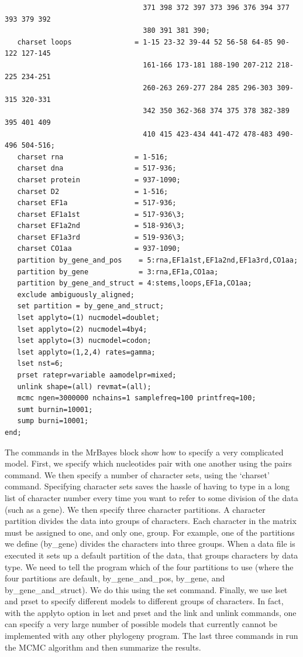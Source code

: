 \documentclass{svmult}
\begin{document}
\begin{verbatim}
                                 371 398 372 397 373 396 376 394 377 393 379 392 
                                 380 391 381 390;
   charset loops               = 1-15 23-32 39-44 52 56-58 64-85 90-122 127-145 
                                 161-166 173-181 188-190 207-212 218-225 234-251 
                                 260-263 269-277 284 285 296-303 309-315 320-331 
                                 342 350 362-368 374 375 378 382-389 395 401 409 
                                 410 415 423-434 441-472 478-483 490-496 504-516;
   charset rna                 = 1-516;
   charset dna                 = 517-936;
   charset protein             = 937-1090;
   charset D2                  = 1-516;
   charset EF1a                = 517-936;
   charset EF1a1st             = 517-936\3;
   charset EF1a2nd             = 518-936\3;
   charset EF1a3rd             = 519-936\3;
   charset CO1aa               = 937-1090;
   partition by_gene_and_pos    = 5:rna,EF1a1st,EF1a2nd,EF1a3rd,CO1aa;
   partition by_gene            = 3:rna,EF1a,CO1aa;
   partition by_gene_and_struct = 4:stems,loops,EF1a,CO1aa;
   exclude ambiguously_aligned;
   set partition = by_gene_and_struct;
   lset applyto=(1) nucmodel=doublet;
   lset applyto=(2) nucmodel=4by4;
   lset applyto=(3) nucmodel=codon;
   lset applyto=(1,2,4) rates=gamma;
   lset nst=6;
   prset ratepr=variable aamodelpr=mixed;
   unlink shape=(all) revmat=(all);
   mcmc ngen=3000000 nchains=1 samplefreq=100 printfreq=100;
   sumt burnin=10001;
   sump burni=10001;
end;
\end{verbatim}
\normalsize
The commands in the MrBayes block show how to specify a very complicated model.  First, we specify
which nucleotides pair with one another using the pairs command. We then specify a number of
character sets, using the `charset' command. Specifying character sets saves the hassle of having
to type in a long list of character number every time you want to refer to some division of the
data (such as a gene). We then specify three character partitions. A character partition divides
the data into groups of characters. Each character in the matrix must be assigned to one, and only
one, group. For example, one of the partitions we define (by\_gene) divides the characters into
three groups. When a data file is executed it sets up a default partition of the data, that groups
characters by data type. We need to tell the program which of the four partitions to use (where the
four partitions are default, by\_gene\_and\_pos, by\_gene, and by\_gene\_and\_struct). We do this
using the set command. Finally, we use lset and prset to specify different models to different
groups of characters. In fact, with the applyto option in lset and prset and the link and unlink
commands, one can specify a very large number of possible models that currently cannot be
implemented with any other phylogeny program. The last three commands in run the MCMC algorithm and
then summarize the results.
\end{document}
